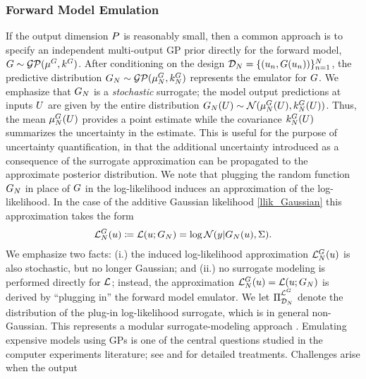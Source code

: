 \documentclass[12pt]{article}
\begin{document}
\subsubsection{Forward Model Emulation}
If the output dimension $\dimObs$ is reasonably small, then a common approach is to specify an independent 
multi-output GP prior directly for the forward model, $\fwd \sim \GP(\emMeanPrior{\fwd}, \emKerPrior{\fwd})$. After 
conditioning on the design $\design[\Ndesign] = \{(\Par_{\idxDesign}, \fwd(\Par_{\idxDesign}))\}_{\idxDesign=1}^{\Ndesign}$, 
the predictive distribution $\fwdEm[\Ndesign] \sim \GP(\emMean[\Ndesign]{\fwd}, \emKer[\Ndesign]{\fwd})$ 
represents the emulator for $\fwd$. We emphasize that $\fwdEm[\Ndesign]$ is a \textit{stochastic} surrogate; 
the model output predictions at inputs $\parMat$ are given by the entire distribution 
$\fwdEm[\Ndesign](\parMat) \sim \Gaussian(\emMean[\Ndesign]{\fwd}(\parMat), \emKer[\Ndesign]{\fwd}(\parMat))$. 
Thus, the mean $\emMean[\Ndesign]{\fwd}(\parMat)$ provides a point estimate while the covariance 
$\emKer[\Ndesign]{\fwd}(\parMat)$ summarizes the uncertainty in the estimate. This is useful for the purpose
of uncertainty quantification, in that the additional uncertainty introduced as a consequence of the surrogate 
approximation can be propagated to the approximate posterior distribution. We note that plugging the random 
function $\fwdEm[\Ndesign]$ in place of $\fwd$ in the log-likelihood induces an approximation of the log-likelihood. 
In the case of the additive Gaussian likelihood \ref{llik_Gaussian} this approximation takes the form 
\begin{align}
\llikEmFwd(\Par) \Def \llik(\Par; \fwdEm) =  \log\Gaussian(\obs| \fwdEm[\Ndesign](\Par), \likPar). \label{induced_llik_emulator}
\end{align}
We emphasize two facts: (i.) the induced log-likelihood approximation $\llikEmFwd[\Ndesign](\Par)$ is also 
stochastic, but no longer Gaussian; and (ii.) no surrogate modeling is performed directly for $\llik$; instead, 
the approximation $\llikEmFwd[\Ndesign](\Par) = \llik(\Par; \fwdEm[\Ndesign])$ is derived by ``plugging in'' the 
forward model emulator. We let $\emLaw{\llikEmFwd[]}$ denote the distribution of the plug-in 
log-likelihood surrogate, which is in general non-Gaussian.
This represents a modular surrogate-modeling approach \cite{modularization}. 
Emulating expensive models using GPs is one of the central questions 
studied in the computer experiments literature; see \cite{gramacy2020surrogates} and 
\cite{design_analysis_computer_experiments} for detailed treatments. Challenges arise when the output
\end{document}
